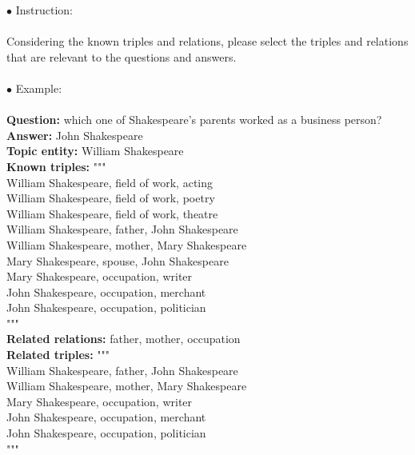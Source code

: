 

\begin{tcolorbox}[prompt=
{\begin{prompt} \label{prompts for generating paths}The Prompt for Path Generation
\end{prompt}}]
$\bullet$ Instruction: \\ \\
Considering the known triples and relations, please select the triples and relations that are relevant to the questions and answers. \\
\\
$\bullet$ Example: \\ \\
\textbf{Question:} which one of Shakespeare's parents worked as a business person? \\
\textbf{Answer:} John Shakespeare \\
\textbf{Topic entity:} William Shakespeare \\
\textbf{Known triples:} """ \\
William Shakespeare, field of work, acting \\
William Shakespeare, field of work, poetry \\
William Shakespeare, field of work, theatre \\
William Shakespeare, father, John Shakespeare \\
William Shakespeare, mother, Mary Shakespeare \\
Mary Shakespeare, spouse, John Shakespeare \\
Mary Shakespeare, occupation, writer \\
John Shakespeare, occupation, merchant \\
John Shakespeare, occupation, politician \\
""" \\
\textbf{Related relations:} father, mother, occupation \\
\textbf{Related triples:} """ \\
William Shakespeare, father, John Shakespeare \\
William Shakespeare, mother, Mary Shakespeare \\
Mary Shakespeare, occupation, writer \\
John Shakespeare, occupation, merchant \\
John Shakespeare, occupation, politician \\
""" 
\end{tcolorbox}